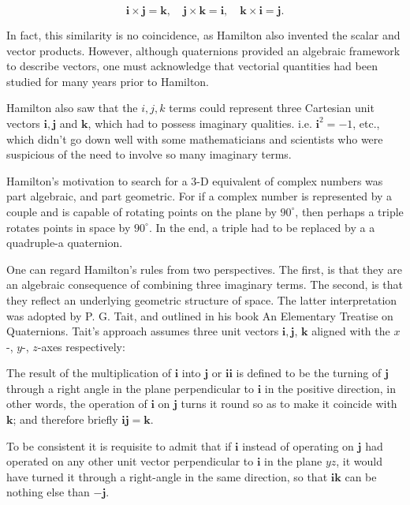 \documentclass[10pt]{article}
\begin{document}
$$
\mathbf{i} \times \mathbf{j}=\mathbf{k}, \quad \mathbf{j} \times \mathbf{k}=\mathbf{i}, \quad \mathbf{k} \times \mathbf{i}=\mathbf{j} .
$$

In fact, this similarity is no coincidence, as Hamilton also invented the scalar and vector products. However, although quaternions provided an algebraic framework to describe vectors, one must acknowledge that vectorial quantities had been studied for many years prior to Hamilton.

Hamilton also saw that the $i, j, k$ terms could represent three Cartesian unit vectors $\mathbf{i}, \mathbf{j}$ and $\mathbf{k}$, which had to possess imaginary qualities. i.e. $\mathbf{i}^{2}=-1$, etc., which didn't go down well with some mathematicians and scientists who were suspicious of the need to involve so many imaginary terms.

Hamilton's motivation to search for a 3-D equivalent of complex numbers was part algebraic, and part geometric. For if a complex number is represented by a couple and is capable of rotating points on the plane by $90^{\circ}$, then perhaps a triple rotates points in space by $90^{\circ}$. In the end, a triple had to be replaced by a a quadruple-a quaternion.

One can regard Hamilton's rules from two perspectives. The first, is that they are an algebraic consequence of combining three imaginary terms. The second, is that they reflect an underlying geometric structure of space. The latter interpretation was adopted by P. G. Tait, and outlined in his book An Elementary Treatise on Quaternions. Tait's approach assumes three unit vectors $\mathbf{i}, \mathbf{j}$, $\mathbf{k}$ aligned with the $x$-, $y$-, $z$-axes respectively:

The result of the multiplication of $\mathbf{i}$ into $\mathbf{j}$ or $\mathbf{i} \mathbf{i}$ is defined to be the turning of $\mathbf{j}$ through a right angle in the plane perpendicular to $\mathbf{i}$ in the positive direction, in other words, the operation of $\mathbf{i}$ on $\mathbf{j}$ turns it round so as to make it coincide with $\mathbf{k}$; and therefore briefly $\mathbf{i} \mathbf{j}=\mathbf{k}$.

To be consistent it is requisite to admit that if $\mathbf{i}$ instead of operating on $\mathbf{j}$ had operated on any other unit vector perpendicular to $\mathbf{i}$ in the plane $y z$, it would have turned it through a right-angle in the same direction, so that $\mathbf{i k}$ can be nothing else than $-\mathbf{j}$.
\end{document}
